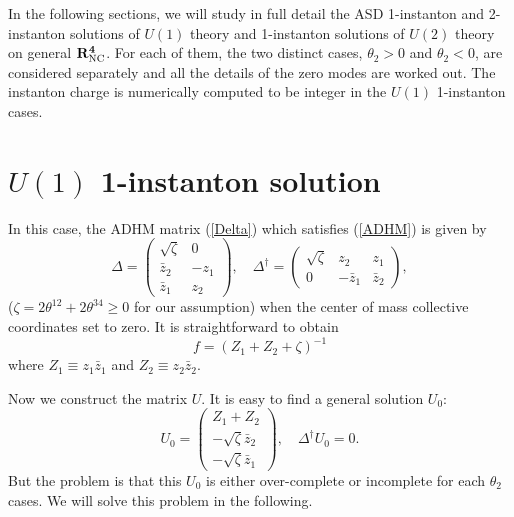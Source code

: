 \documentclass[a4paper,a4paper]{article}
\begin{document}
In the following sections, we will study in full detail the ASD
1-instanton and 2-instanton solutions of $U(1)$ theory and
1-instanton solutions of $U(2)$ theory on general $\bf{R}_{\rm
NC}^4$. For each of them, the two distinct cases, $\theta_2>0$ and
$\theta_2<0$, are considered separately and all the details of the
zero modes are worked out. The instanton charge is numerically
computed to be integer in the $U(1)$ 1-instanton cases.

\section{$U(1)$ 1-instanton solution}

In this case, the ADHM matrix (\ref{Delta}) which satisfies
(\ref{ADHM}) is given by
\begin{equation}
\Delta=\left(\begin{array}{cc} \sqrt{\zeta}& 0 \\ \bar z_2 & -z_1
\\ \bar z_1 & z_2 \end{array}\right),
\quad\Delta^\dagger=\left(\begin{array}{ccc} \sqrt{\zeta}& z_2 &
z_1
\\ 0 & -\bar z_1 & \bar z_2 \end{array}\right),
\end{equation}
($\zeta=2\theta^{12}+2\theta^{34}\geq 0$ for our assumption) when
the center of mass collective coordinates set to zero. It is
straightforward to obtain
\begin{equation}
f=(Z_1+Z_2+\zeta)^{-1}
\end{equation}
where $Z_1\equiv z_1\bar z_1$ and $Z_2\equiv z_2\bar z_2$.

Now we construct the matrix $U$. It is easy to find a general
solution $U_0$:
\begin{equation}
\label{U_0}
U_0=\left(\begin{array}{c} Z_1+Z_2 \\ -\sqrt{\zeta}\bar z_2
\\ -\sqrt{\zeta}\bar z_1 \end{array}\right),\quad\Delta^\dagger
 U_0=0.
\end{equation}
But the problem is that this $U_0$ is either over-complete or
incomplete for each $\theta_2$ cases. We will solve this problem
in the following.
\end{document}
